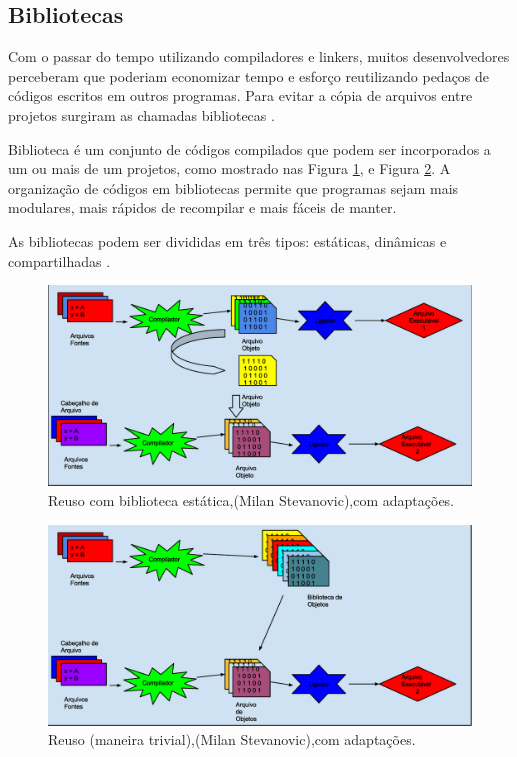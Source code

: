 \subsection{Bibliotecas}

Com o passar do tempo utilizando compiladores e linkers, muitos 
desenvolvedores perceberam que poderiam economizar tempo e esforço 
reutilizando pedaços de códigos escritos em outros programas. Para evitar a
 cópia de arquivos entre projetos surgiram as chamadas bibliotecas \cite{ref38}.

Biblioteca é um conjunto de códigos compilados que podem ser incorporados a
 um ou mais de um projetos, como mostrado nas Figura \ref{fig04}, e Figura
 \ref{fig05}. A organização de códigos em bibliotecas permite que 
programas sejam mais modulares, mais rápidos de recompilar e mais 
fáceis de manter\cite{Lasca}.

As bibliotecas podem ser divididas em três tipos: estáticas, 
dinâmicas e compartilhadas \cite{Lasca}.

\begin{figure}[h]
    \centering
        \includegraphics[keepaspectratio=true,scale=0.38]{figuras/reuso_lib_estatica.eps}
    \caption{ Reuso com biblioteca estática,(Milan Stevanovic),com adaptações.}
    \label{fig04}
\end{figure}

\begin{figure}[h]
    \centering
        \includegraphics[keepaspectratio=true,scale=0.38]{figuras/reuso_lib_estatica2.eps}
    \caption{Reuso (maneira trivial),(Milan Stevanovic),com adaptações.}
    \label{fig05}
\end{figure}


